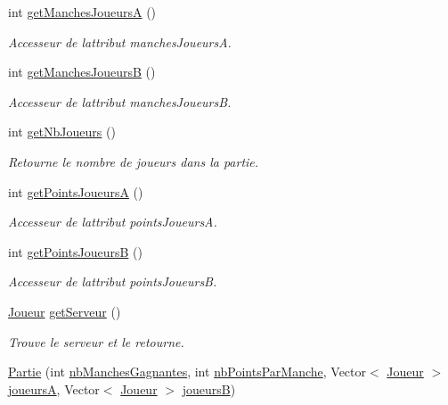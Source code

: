 \begin{DoxyCompactItemize}
int \hyperlink{classcom_1_1example_1_1area_1_1_partie_a7c863edbbdd07ddc7f71616949823201}{get\+Manches\+JoueursA} ()
\begin{DoxyCompactList}\small\item\em Accesseur de l\textquotesingle{}attribut manches\+JoueursA. \end{DoxyCompactList}\item 
int \hyperlink{classcom_1_1example_1_1area_1_1_partie_a706fa101c4fcad9f2ea6473b5778b55e}{get\+Manches\+JoueursB} ()
\begin{DoxyCompactList}\small\item\em Accesseur de l\textquotesingle{}attribut manches\+JoueursB. \end{DoxyCompactList}\item 
int \hyperlink{classcom_1_1example_1_1area_1_1_partie_a70ddc06f598fa7ffb00c315fc9490647}{get\+Nb\+Joueurs} ()
\begin{DoxyCompactList}\small\item\em Retourne le nombre de joueurs dans la partie. \end{DoxyCompactList}\item 
int \hyperlink{classcom_1_1example_1_1area_1_1_partie_a5ec15306fc24648c1698ea0cdd50bf53}{get\+Points\+JoueursA} ()
\begin{DoxyCompactList}\small\item\em Accesseur de l\textquotesingle{}attribut points\+JoueursA. \end{DoxyCompactList}\item 
int \hyperlink{classcom_1_1example_1_1area_1_1_partie_a376bb79a67c311e1eb681387e9440bbd}{get\+Points\+JoueursB} ()
\begin{DoxyCompactList}\small\item\em Accesseur de l\textquotesingle{}attribut points\+JoueursB. \end{DoxyCompactList}\item 
\hyperlink{classcom_1_1example_1_1area_1_1_joueur}{Joueur} \hyperlink{classcom_1_1example_1_1area_1_1_partie_a34f75da57f51b710fccbce4aafda28d4}{get\+Serveur} ()
\begin{DoxyCompactList}\small\item\em Trouve le serveur et le retourne. \end{DoxyCompactList}\item 
\hyperlink{classcom_1_1example_1_1area_1_1_partie_a147e80f330c0236dbe800f5e2b4c2c84}{Partie} (int \hyperlink{classcom_1_1example_1_1area_1_1_partie_a1d1d6ce602fecf229217fe3d7a4d9152}{nb\+Manches\+Gagnantes}, int \hyperlink{classcom_1_1example_1_1area_1_1_partie_a23cd7e19042eece7057f810bba2f4f2c}{nb\+Points\+Par\+Manche}, Vector$<$ \hyperlink{classcom_1_1example_1_1area_1_1_joueur}{Joueur} $>$ \hyperlink{classcom_1_1example_1_1area_1_1_partie_a190a033a96ec435589ac53f78d60890b}{joueursA}, Vector$<$ \hyperlink{classcom_1_1example_1_1area_1_1_joueur}{Joueur} $>$ \hyperlink{classcom_1_1example_1_1area_1_1_partie_a208910b83df461c3a2503f3b28650ce8}{joueursB})

\end{DoxyCompactItemize}
